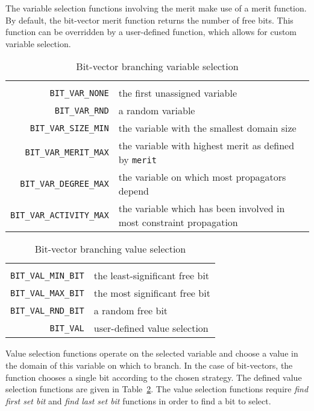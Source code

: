 \documentclass[a4paper,10pt,twoside,openright]{book}
\newcommand{\bh}[1]{\text{\fontfamily{\sfdefault}\selectfont\textbf{#1}}}
\newcommand*\cd[1]{\texttt{#1}}
\begin{document}
The variable selection functions involving the merit
make use of a merit function.
By default,
the bit-vector merit function returns the number of free bits.
This function can be overridden by a user-defined function, 
which allows for custom variable selection.
    \begin{table}[H]
        \small
        \begin{tabularx}{\linewidth}{ r X }
            \bh{variable selection} & \bh{select\ldots} \\
            \cd{BIT_VAR_NONE}	&	the first unassigned variable \\
            \cd{BIT_VAR_RND}	&	a random variable \\
            \cd{BIT_VAR_SIZE_MIN}	&	 the variable with the smallest domain size \\
            \cd{BIT_VAR_MERIT_MAX}	&	the variable with highest merit as defined by \cd{merit} \\
            \cd{BIT_VAR_DEGREE_MAX}	&	the variable on which most propagators depend \\
            \cd{BIT_VAR_ACTIVITY_MAX}	&	the variable which has been involved in most constraint propagation \\
        \end{tabularx}
        \caption{Bit-vector branching variable selection}
        \label{tab:varsel}
    \end{table}
    \begin{table}[H]
        \small
        \begin{tabularx}{\linewidth}{ r X }
            \bh{value selection} & \bh{select\ldots} \\
            \cd{BIT_VAL_MIN_BIT}	&	the least-significant free bit \\
            \cd{BIT_VAL_MAX_BIT}	&	the most significant free bit \\
            \cd{BIT_VAL_RND_BIT}	&	a random free bit \\
            \cd{BIT_VAL}	&	user-defined value selection \\
        \end{tabularx}
        \caption{Bit-vector branching value selection}
        \label{tab:valsel}
    \end{table}
Value selection functions
operate on the selected variable and choose a 
value in the domain of this variable on which to branch.
In the case of bit-vectors, the function chooses a single
bit according to the chosen strategy.
The defined value selection functions are given in Table~\ref{tab:valsel}.
The value selection functions require 
\textit{find first set bit} and \textit{find last set bit} functions in order
to find a bit to select. 
\end{document}
